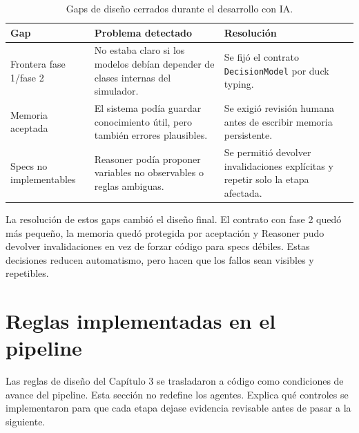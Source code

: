 \begin{table}[H]
\begin{center}
\small
\begin{tabular}{|p{3.1cm}|p{4.2cm}|p{5.1cm}|} \hline
\textbf{Gap} & \textbf{Problema detectado} & \textbf{Resolución} \\ \hline
Frontera fase 1/fase 2 & No estaba claro si los modelos debían depender de clases internas del simulador. & Se fijó el contrato \texttt{DecisionModel} por duck typing. \\ \hline
Memoria aceptada & El sistema podía guardar conocimiento útil, pero también errores plausibles. & Se exigió revisión humana antes de escribir memoria persistente. \\ \hline
Specs no implementables & Reasoner podía proponer variables no observables o reglas ambiguas. & Se permitió devolver invalidaciones explícitas y repetir solo la etapa afectada. \\ \hline
\end{tabular}
\caption{Gaps de diseño cerrados durante el desarrollo con IA.}
\end{center}
\end{table}

La resolución de estos gaps cambió el diseño final. El contrato con fase 2
quedó más pequeño, la memoria quedó protegida por aceptación y Reasoner pudo
devolver invalidaciones en vez de forzar código para specs débiles. Estas
decisiones reducen automatismo, pero hacen que los fallos sean visibles y
repetibles.

\section{Reglas implementadas en el pipeline}

Las reglas de diseño del Capítulo 3 se trasladaron a código como condiciones
de avance del pipeline. Esta sección no redefine los agentes. Explica qué
controles se implementaron para que cada etapa dejase evidencia revisable antes
de pasar a la siguiente.

